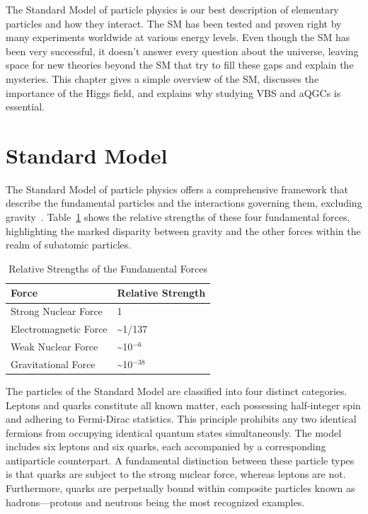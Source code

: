 \label{ch:theory_overview}

The Standard Model of particle physics is our best description of elementary particles and how they interact. The SM has been tested and proven right by many experiments worldwide at various energy levels. Even though the SM has been very successful, it doesn't answer every question about the universe, leaving space for new theories beyond the SM that try to fill these gaps and explain the mysteries. This chapter gives a simple overview of the SM, discusses the importance of the Higgs field, and explains why studying VBS and aQGCs is essential.

\section{Standard Model}
The Standard Model of particle physics offers a comprehensive framework that describe the fundamental particles and the interactions governing them, excluding gravity~\cite{PeskinSchroeder1995}. 
Table~\ref{table:fundamental_forces} shows the relative strengths of these four fundamental forces, highlighting the marked disparity between gravity and the other forces within the realm of subatomic particles.


\begin{table}[h]
\centering
\begin{tabular}{|l|l|}
\hline
\textbf{Force}         & \textbf{Relative Strength} \\ \hline
Strong Nuclear Force   & 1                          \\ \hline
Electromagnetic Force  & \textasciitilde{}1/137     \\ \hline
Weak Nuclear Force     & \textasciitilde{}10\(^{-6}\) \\ \hline
Gravitational Force    & \textasciitilde{}10\(^{-38}\) \\ \hline
\end{tabular}
\caption{Relative Strengths of the Fundamental Forces}
\label{table:fundamental_forces}
\end{table}


The particles of the Standard Model are classified into four distinct categories. Leptons and quarks constitute all known matter, each possessing half-integer spin and adhering to Fermi-Dirac statistics. This principle prohibits any two identical fermions from occupying identical quantum states simultaneously. The model includes six leptons and six quarks, each accompanied by a corresponding antiparticle counterpart. A fundamental distinction between these particle types is that quarks are subject to the strong nuclear force, whereas leptons are not. Furthermore, quarks are perpetually bound within composite particles known as hadrons—protons and neutrons being the most recognized examples.

